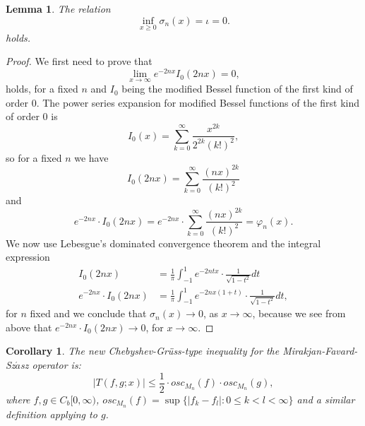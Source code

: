 \documentclass[12pt,leqno,a4paper,dvips,twoside]{article}
\newtheorem{lema}[thm]{Lemma}%
\newtheorem{cor}[thm]{Corollary}%
\begin{document}
{\begin{lema}
	The relation
	\begin{equation*}
		\inf_{x\geq 0}\sigma_n(x)=\iota=0. 
	\end{equation*}
holds. 
\end{lema}

\begin{proof}
	We first need to prove that 
		\begin{equation*}
			\lim_{x\to\infty}e^{-2nx}I_0(2nx)=0,
		\end{equation*}
	holds, for a fixed $n$ and $I_0$ being the modified Bessel function of the first kind of
	order $0$.
	The power series expansion for modified Bessel functions of the first kind of order $0$ is 
		\begin{equation*}
			I_0(x)=\sum^{\infty}_{k=0}{\frac{x^{2k}}{2^{2k}(k!)^2}},
		\end{equation*} 
	so for a fixed $n$ we have
		\begin{equation*}
			I_0(2nx)=\sum^{\infty}_{k=0}{\frac{(nx)^{2k}}{(k!)^2}}
		\end{equation*}
	and 
		\begin{equation*}
			e^{-2nx}\cdot I_0(2nx)=e^{-2nx}\cdot\sum^{\infty}_{k=0}{\frac{(nx)^{2k}}{(k!)^2}}=\varphi_n(x).
		\end{equation*}
	We now use Lebesgue's dominated convergence theorem and the integral expression
		\begin{align*}
			I_0(2nx)&=\frac{1}{\pi}\int^{1}_{-1}{e^{-2ntx}\cdot \frac{1}{\sqrt{1-t^2}}dt}\\
			e^{-2nx}\cdot I_0(2nx)&=\frac{1}{\pi}\int^{1}_{-1}{e^{-2nx(1+t)}\cdot \frac{1}{\sqrt{1-t^2}}dt},
		\end{align*}
	for $n$ fixed and we conclude that $\sigma_n(x)\to 0$, as $x\to \infty$, because we see from above that $e^{-2nx}\cdot I_0(2nx)\to 0$, for $x\to\infty$.  
\end{proof}

\begin{cor}\label{cor6.3}
The new Chebyshev-Gr\"{u}ss-type inequality for the  Mirakjan-Favard-Sz$\acute{a}$sz operator  is:
	\begin{equation*}
		\left|T(f,g;x)\right|\leq \frac{1}{2}\cdot osc_{M_n}(f)\cdot osc_{M_n}(g),
	\end{equation*}	
where $f,g\in C_b[0,\infty)$, $osc_{M_n}(f)=\sup\{\left|f_k-f_l\right|:0\leq k<l<\infty\}$ and a similar definition applying to $g$. 
\end{cor}

}
\end{document}
